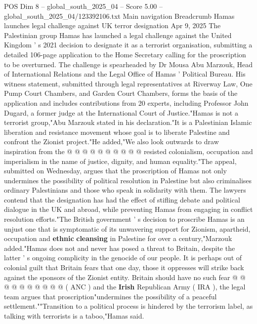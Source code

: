 \begin{textsample}{POS Dim 8 – global\_south\_2025\_04 – Score 5.00 – global\_south\_2025\_04/123392106.txt}  \label{ex:f8_pos_161}
Main navigation Breadcrumb Hamas launches legal challenge against UK terror designation Apr 9, 2025 The Palestinian group Hamas has launched a legal challenge against the United Kingdom ' s 2021 decision to designate it as a terrorist organisation, submitting a detailed 106-page application to the Home Secretary calling for the proscription to be overturned.
The challenge is spearheaded by Dr Mousa Abu Marzouk, Head of International Relations and the Legal Office of Hamas ' Political Bureau.
His witness statement, submitted through legal representatives at Riverway Law, One Pump Court Chambers, and Garden Court Chambers, forms the basis of the application and includes contributions from 20 experts, including Professor John Dugard, a former judge at the International Court of Justice."Hamas is not a terrorist group,"Abu Marzouk stated in his declaration."It is a Palestinian Islamic liberation and resistance movement whose goal is to liberate Palestine and confront the Zionist project."He added,"We also look outwards to draw inspiration from the @ @ @ @ @ @ @ @ @ @ resisted colonialism, occupation and imperialism in the name of justice, dignity, and human equality."The appeal, submitted on Wednesday, argues that the proscription of Hamas not only undermines the possibility of political resolution in Palestine but also criminalises ordinary Palestinians and those who speak in solidarity with them.
The lawyers contend that the designation has had the effect of stifling debate and political dialogue in the UK and abroad, while preventing Hamas from engaging in conflict resolution efforts."The British government ' s decision to proscribe Hamas is an unjust one that is symptomatic of its unwavering support for Zionism, apartheid, occupation and \textbf{ethnic} \textbf{cleansing} in Palestine for over a century,"Marzouk added."Hamas does not and never has posed a threat to Britain, despite the latter ' s ongoing complicity in the genocide of our people.
It is perhaps out of colonial guilt that Britain fears that one day, those it oppresses will strike back against the sponsors of the Zionist entity.
Britain should have no such fear @ @ @ @ @ @ @ @ @ @ ( ANC ) and the \textbf{Irish} Republican Army ( IRA ), the legal team argues that proscription"undermines the possibility of a peaceful settlement.""Transition to a political process is hindered by the terrorism label, as talking with terrorists is a taboo,"Hamas said.

\end{textsample}
